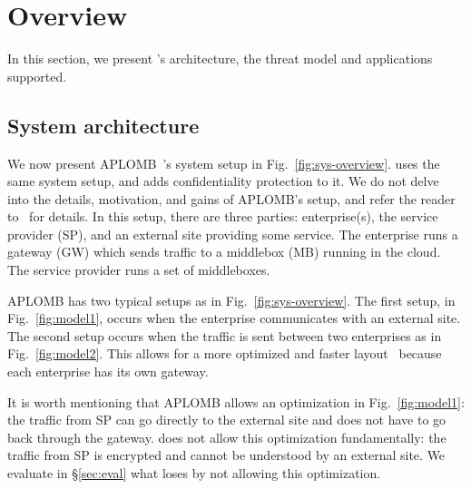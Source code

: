 


     
\section{Overview}\label{sec:overview}








In this section, we present \sys's architecture, the threat model and applications supported.


\subsection{System architecture}

We now present APLOMB~\cite{aplomb}'s system setup in Fig.~\ref{fig:sys-overview}. \sys uses the same system setup, and adds confidentiality protection to it.
We do not delve into the details, motivation, and gains of APLOMB's setup, and refer the reader to~\cite{aplomb} for details. 
In this setup, there are three parties: enterprise(s), the service provider (SP), and an external site providing
some service. The enterprise runs a gateway (GW) which sends traffic to a middlebox (MB) running in the cloud.
The service provider runs a set of middleboxes. 

APLOMB has two typical setups as in Fig.~\ref{fig:sys-overview}.  The first setup, in Fig.~\ref{fig:model1},  occurs when the enterprise communicates with an external site. The second setup occurs when the traffic is sent between two enterprises as in Fig.~\ref{fig:model2}. This allows for a more optimized and faster layout~\cite{aplomb} because  each enterprise has its own gateway.

It is worth mentioning that APLOMB allows an optimization in Fig.~\ref{fig:model1}: the traffic from SP can go directly to the external site and does not have to go back through the gateway. \sys does not allow this optimization fundamentally: the traffic from SP is encrypted and cannot be understood by an external site. We evaluate in \S\ref{sec:eval} what \sys loses by not allowing this optimization. 








